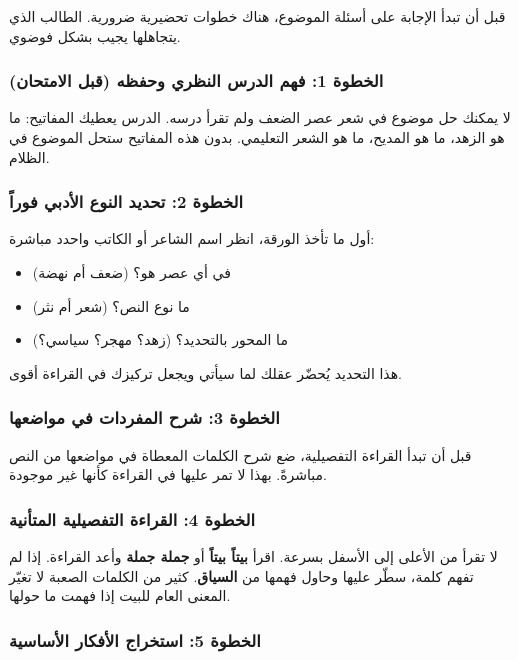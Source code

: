 \documentclass[12pt,a4paper]{book}
\begin{document}
	قبل أن تبدأ الإجابة على أسئلة الموضوع، هناك خطوات تحضيرية ضرورية. الطالب الذي يتجاهلها يجيب بشكل فوضوي.
	
	\subsubsection*{الخطوة 1: فهم الدرس النظري وحفظه (قبل الامتحان)}
	
	لا يمكنك حل موضوع في شعر عصر الضعف ولم تقرأ درسه. الدرس يعطيك المفاتيح: ما هو الزهد، ما هو المديح، ما هو الشعر التعليمي. بدون هذه المفاتيح ستحل الموضوع في الظلام.
	
	\subsubsection*{الخطوة 2: تحديد النوع الأدبي فوراً}
	
	أول ما تأخذ الورقة، انظر اسم الشاعر أو الكاتب واحدد مباشرة:
	\begin{itemize}
		\item في أي عصر هو؟ (ضعف أم نهضة)
		\item ما نوع النص؟ (شعر أم نثر)
		\item ما المحور بالتحديد؟ (زهد؟ مهجر؟ سياسي؟)
	\end{itemize}
	
	هذا التحديد يُحضّر عقلك لما سيأتي ويجعل تركيزك في القراءة أقوى.
	
	\subsubsection*{الخطوة 3: شرح المفردات في مواضعها}
	
	قبل أن تبدأ القراءة التفصيلية، ضع شرح الكلمات المعطاة في مواضعها من النص مباشرةً. بهذا لا تمر عليها في القراءة كأنها غير موجودة.
	
	\subsubsection*{الخطوة 4: القراءة التفصيلية المتأنية}
	
	لا تقرأ من الأعلى إلى الأسفل بسرعة. اقرأ \textbf{بيتاً بيتاً} أو \textbf{جملة جملة} وأعد القراءة. إذا لم تفهم كلمة، سطّر عليها وحاول فهمها من \textbf{السياق}. كثير من الكلمات الصعبة لا تغيّر المعنى العام للبيت إذا فهمت ما حولها.
	
	\subsubsection*{الخطوة 5: استخراج الأفكار الأساسية}
	
\end{document}
